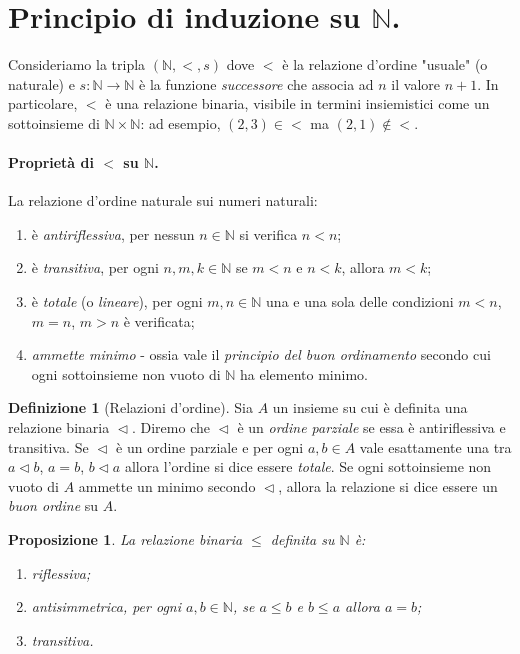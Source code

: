 \documentclass[fontsize = 11 pt, paper=A4, oneside, index=totoc, hyperref]{book}
\theoremstyle{definition}
\newtheorem{dfn}{Definizione}[]
\theoremstyle{plain}
\newtheorem{prp}{Proposizione}[section]
\newcommand{\N}{\mathbb{N}}
\newcommand{\order}{\vartriangleleft}
\begin{document}
\section{Principio di induzione su \(\mathbb{N}\).}

Consideriamo la tripla \(\left(\N, <, s \right)\) dove \(<\) è la relazione d'ordine "usuale" (o naturale) e \(s \colon \N \to \N\) è la funzione \emph{successore} che associa ad \(n\) il valore \(n+1\). In particolare, \(<\) è una relazione binaria, visibile in termini insiemistici come un sottoinsieme di \(\N \times \N\): ad esempio, \((2,3) \in <\) ma \((2,1) \notin <\).

\paragraph{Proprietà di \(<\) su \(\N\).} La relazione d'ordine naturale sui numeri naturali:
\begin{enumerate}
  \item è \emph{antiriflessiva}, per nessun \(n \in \N\) si verifica \(n < n\);
  \item è \emph{transitiva}, per ogni \(n, m, k \in \N\) se \(m < n\) e \(n < k\), allora \(m < k\);
  \item è \emph{totale} (o \emph{lineare}), per ogni \(m,n \in \N\) una e una sola delle condizioni \(m < n\), \(m = n\), \(m > n\) è verificata;
  \item \emph{ammette minimo} - ossia vale il \emph{principio del buon ordinamento} secondo cui ogni sottoinsieme non vuoto di \(\N\) ha elemento minimo.
\end{enumerate}

\begin{dfn}[Relazioni d'ordine] Sia \(A\) un insieme su cui è definita una relazione binaria \(\order\). Diremo che \(\order\) è un \emph{ordine parziale} se essa è antiriflessiva e transitiva. Se \(\order\) è un ordine parziale e per ogni \(a,b \in A\) vale esattamente una tra \(a \order b\), \(a = b\), \(b \order a\) allora l'ordine si dice essere \emph{totale}. Se ogni sottoinsieme non vuoto di \(A\) ammette un minimo secondo \(\order\), allora la relazione si dice essere un \emph{buon ordine} su \(A\).
\end{dfn}

\begin{prp} La relazione binaria \(\le\) definita su \(\N\) è:
  \begin{enumerate}
    \item \emph{riflessiva};
    \item \emph{antisimmetrica}, per ogni \(a, b \in \N\), se \(a \le b\) e \(b \le a\) allora \(a = b\);
    \item \emph{transitiva}.
  \end{enumerate}
\end{prp}
\end{document}
